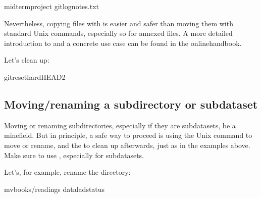 \begin{sphinxVerbatim}[commandchars=\\\{\}]
midterm\PYGZus{}project
gitlognotes.txt

\end{sphinxVerbatim}

\sphinxAtStartPar
Nevertheless, copying files with  is easier and safer
than moving them with standard Unix commands, especially so for annexed files.
A more detailed introduction to  and a concrete
use case can be found in the online\sphinxhyphen{}handbook.

\sphinxAtStartPar
Let’s clean up:

\begin{sphinxVerbatim}[commandchars=\\\{\}]
gitreset\PYGZhy{}\PYGZhy{}hardHEAD\PYGZti{}2
\end{sphinxVerbatim}


\subsection{Moving/renaming a subdirectory or subdataset}
\label{\detokenize{basics/101-136-filesystem:moving-renaming-a-subdirectory-or-subdataset}}
\sphinxAtStartPar
Moving or renaming subdirectories, especially if they are subdatasets,
 be a minefield. But in principle, a safe way to proceed is using
the Unix  command to move or rename, and the 
to clean up afterwards, just as in the examples above. Make sure to
 use , especially for subdatasets.

\sphinxAtStartPar
Let’s, for example, rename the  directory:

\begin{sphinxVerbatim}[commandchars=\\\{\}]
mvbooks/readings
dataladstatus
\end{sphinxVerbatim}

